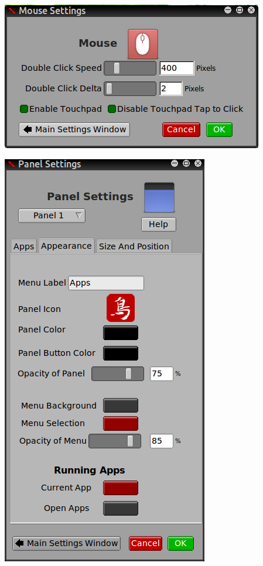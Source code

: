 \documentclass[12pt,a4paper]{book}
\begin{document}
\begin{center}
\includegraphics[width=0.7\linewidth]{mouse-settings}
\end{center}

\begin{center}
\includegraphics[width=0.7\linewidth]{panel-settings}
\end{center}
\end{document}
